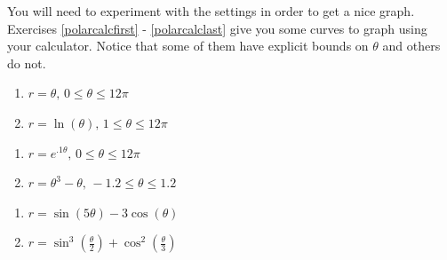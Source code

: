 You will need to experiment with the settings in order to get a nice graph.  Exercises \ref{polarcalcfirst} - \ref{polarcalclast} give you some curves to graph using your calculator.  Notice that some of them have explicit bounds on $\theta$ and others do not.

\begin{multicols}{2}

\begin{enumerate}

\setcounter{enumi}{\value{HW}}

\item $r = \theta, \, 0 \leq \theta \leq 12\pi$ \label{polarcalcfirst}
\item $r = \ln(\theta), \, 1 \leq \theta \leq 12\pi$

\setcounter{HW}{\value{enumi}}

\end{enumerate}

\end{multicols}

\begin{multicols}{2} 

\begin{enumerate}

\setcounter{enumi}{\value{HW}}

\item $r = e^{.1\theta}, \, 0 \leq \theta \leq 12\pi$
\item $r = \theta^{3} - \theta, \, -1.2 \leq \theta \leq 1.2$

\setcounter{HW}{\value{enumi}}

\end{enumerate}

\end{multicols}

\begin{multicols}{2} 

\begin{enumerate}

\setcounter{enumi}{\value{HW}}

\item $r = \sin(5\theta) - 3\cos(\theta)$
\item $r = \sin^{3}\left(\frac{\theta}{2}\right) + \cos^{2}\left(\frac{\theta}{3}\right)$

\setcounter{HW}{\value{enumi}}

\end{enumerate}

\end{multicols}


